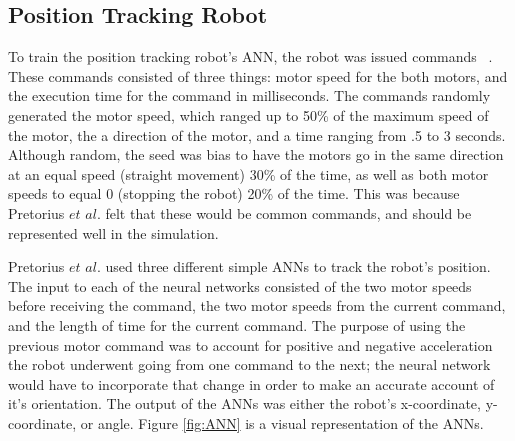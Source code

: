 \documentclass{sig-alternate}
\begin{document}
  \subsection{Position Tracking Robot}\label{Pretorius Evolving}
  To train the position tracking robot's ANN, the robot was issued commands ~\cite{Pretorius:2009:TAN:1632149.1632171}. These commands consisted of three things: motor speed for the both motors, and the execution time for the command in milliseconds. The commands randomly generated the motor speed, which ranged up to 50\% of the maximum speed of the motor, the a direction of the motor, and a time ranging from .5 to 3 seconds. Although random, the seed was bias to have the motors go in the same direction at an equal speed (straight movement) 30\% of the time, as well as both motor speeds to equal 0 (stopping the robot) 20\% of the time. This was because  Pretorius $et$ $al.$ felt that these would be common commands, and should be represented well in the simulation.
  
  Pretorius $et$ $al.$ used three different simple ANNs to track the robot's position. The input to each of the neural networks consisted of the two motor speeds before receiving the command, the two motor speeds from the current command, and the length of time for the current command. The purpose of using the previous motor command was to account for positive and negative acceleration the robot underwent going from one command to the next; the neural network would have to incorporate that change in order to make an accurate account of it's orientation. The output of the ANNs was either the robot's x-coordinate, y-coordinate, or angle. Figure \ref{fig:ANN} is a visual representation of the ANNs.
  
\end{document}
